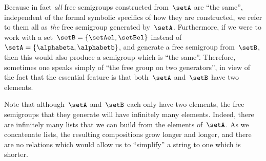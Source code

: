 Because in fact \emph{all} free semigroups constructed from~$\setA$ are ``the same'', independent of the formal symbolic specifics of how they are constructed, we refer to them all as \emph{the} free semigroup generated by~$\setA$.
Furthermore, if we were to work with a set~$\setB = \{ \setAel, \setBel \}$ instead of~$\setA = \{ \alphabeta, \alphabetb\}$, and generate a free semigroup from~$\setB$, then this would also produce a semigroup which is ``the same''.
Therefore, sometimes one speaks simply of ``the free group on two generators'', in view of the fact that the essential feature is that both~$\setA$ and~$\setB$ have two elements.

Note that although~$\setA$ and~$\setB$ each only have two elements, the free semigroups that they generate will have infinitely many elements.
Indeed, there are infinitely many lists that we can build from the elements of~$\setA$.
As we concatenate lists, the resulting compositions grow longer and longer, and there are no relations which would allow us to ``simplify'' a string to one which is shorter.

